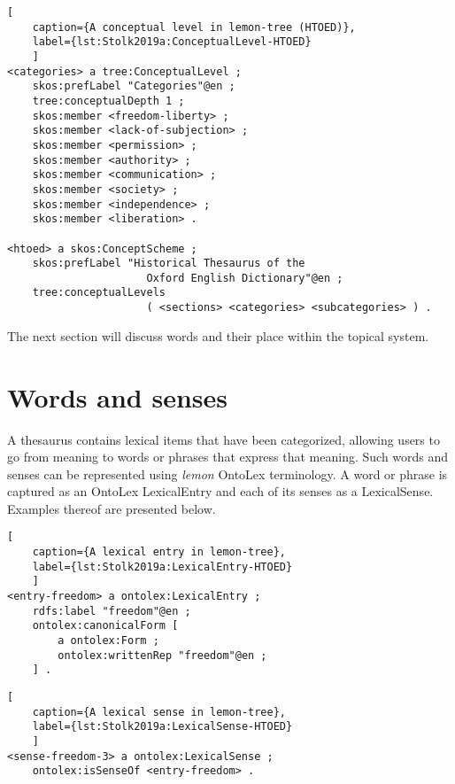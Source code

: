 \noindent
\begin{minipage}[c]{\textwidth}
	\begin{lstlisting}[
	caption={A conceptual level in lemon-tree (HTOED)},
	label={lst:Stolk2019a:ConceptualLevel-HTOED}
	]
<categories> a tree:ConceptualLevel ;
	skos:prefLabel "Categories"@en ;
	tree:conceptualDepth 1 ;
	skos:member <freedom-liberty> ;
	skos:member <lack-of-subjection> ;
	skos:member <permission> ;
	skos:member <authority> ;
	skos:member <communication> ;
	skos:member <society> ;
	skos:member <independence> ;
	skos:member <liberation> .
	
<htoed> a skos:ConceptScheme ;
	skos:prefLabel "Historical Thesaurus of the 
	                  Oxford English Dictionary"@en ;
	tree:conceptualLevels 
	                  ( <sections> <categories> <subcategories> ) .
	\end{lstlisting}
\end{minipage}

\noindent
The next section will discuss words and their place within the topical system.

\section{Words and senses}

A thesaurus contains lexical items that have been categorized, allowing users to go from meaning to words or phrases that express that meaning. 
Such words and senses can be represented using \emph{lemon} OntoLex terminology. 
A word or phrase is captured as an OntoLex LexicalEntry and each of its senses as a LexicalSense. 
Examples thereof are presented below.

\noindent
\begin{minipage}[c]{\textwidth}
	\begin{lstlisting}[
	caption={A lexical entry in lemon-tree},
	label={lst:Stolk2019a:LexicalEntry-HTOED}
	]
<entry-freedom> a ontolex:LexicalEntry ;
	rdfs:label "freedom"@en ;
	ontolex:canonicalForm [ 
	    a ontolex:Form ;
	    ontolex:writtenRep "freedom"@en ;
	] .
	\end{lstlisting}
\end{minipage}

\noindent
\begin{minipage}[c]{\textwidth}
	\begin{lstlisting}[
	caption={A lexical sense in lemon-tree},
	label={lst:Stolk2019a:LexicalSense-HTOED}
	]
<sense-freedom-3> a ontolex:LexicalSense ;
	ontolex:isSenseOf <entry-freedom> .
	\end{lstlisting}
\end{minipage}

